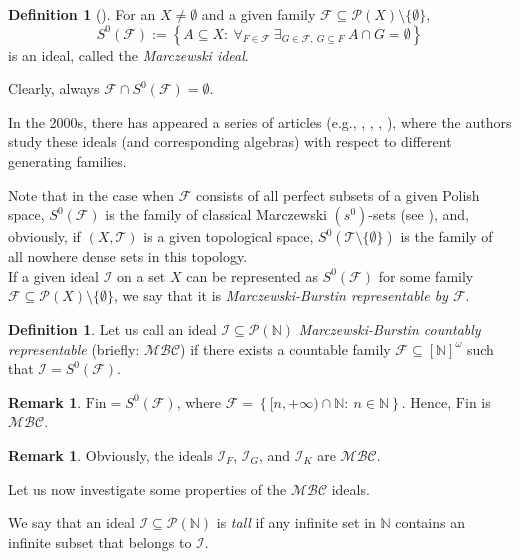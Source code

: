 \documentclass{amsart}
\theoremstyle{definition}
\newtheorem{df}[thm]{Definition}
\newtheorem{remark}[thm]{Remark}
\newcommand{\N}{{\mathbb N}}
\newcommand{\Fin}{\textrm{Fin}}
\newcommand{\I}{\mathcal I}
\newcommand{\T}{\mathcal{T}}
\newcommand{\InfSubs}{[\N]^{\omega}}
\newcommand{\MB}{S^0}
\newcommand{\MBC}{\mathcal{MBC}}
\begin{document}
\begin{df}[\cite{MB}] 
For an $X\neq\emptyset$ and a given family $\mathcal{F}\subseteq \mathcal{P}(X)\setminus\{\emptyset\}$,
$$\MB(\mathcal{F}) := \left\{A\subseteq X :\ \forall_{F\in\mathcal{F}}\ \exists_{G\in\mathcal{F},\ G\subseteq F}\ A\cap G=\emptyset\right\}$$
is an ideal, called the \emph{Marczewski ideal}.
\end{df}

Clearly, always $\mathcal{F}\cap \MB(\mathcal{F})=\emptyset$.

In the 2000s, there has appeared a series of articles (e.g., \cite{MB}, \cite{MB2}, \cite{MB3}, \cite{MB4}), where the authors study these ideals (and corresponding algebras) with respect to different generating families.

Note that in the case when $\mathcal{F}$ consists of all perfect subsets of a given Polish space, $\MB(\mathcal{F})$ is the family of classical Marczewski $(s^0)$-sets (see \cite{Sz}), and, obviously, if $(X,\T)$ is a given topological space, $\MB(\T\setminus\{\emptyset\})$ is the family of all nowhere dense sets in this topology.\\


If a given ideal $\I$ on a set $X$ can be represented as $\MB(\mathcal{F})$ for some family $\mathcal{F}\subseteq \mathcal{P}(X)\setminus\{\emptyset\}$, we say that it is \emph{Marczewski-Burstin representable by $\mathcal{F}$}. 

\begin{df}
Let us call an ideal $\I\subseteq \mathcal{P}(\N)$ \emph{Marczewski-Burstin countably representable} (briefly: $\MBC$) if there exists a countable family $\mathcal{F}\subseteq \InfSubs$ such that $\I = \MB(\mathcal{F})$.
\end{df}

\begin{remark} 
$\Fin = \MB(\mathcal{F})$, where $\mathcal{F}= \left\{[n, +\infty)\cap\N :\ n\in\N\right\}$. Hence, $\Fin$ is $\MBC$.
\end{remark}

\begin{remark} 
Obviously, the ideals $\I_F$, $\I_G$, and $\I_K$ are $\MBC$.
\end{remark}

Let us now investigate some properties of the $\MBC$ ideals.

We say that an ideal $\mathcal{I}\subseteq\mathcal{P}(\N)$ is \emph{tall} if any infinite set in $\N$ contains an infinite subset that belongs to $\mathcal{I}$.
\end{document}
